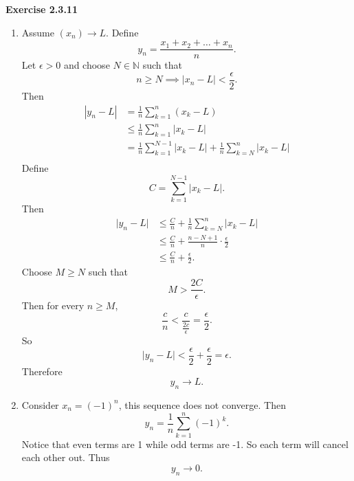 \documentclass[12pt]{article}
\begin{document}
\textbf{Exercise 2.3.11}
\begin{enumerate}[label=(\alph*)]
    \item Assume \( (x_n) \to L\).
          Define
          \[
              y_n = \frac{x_1 + x_2 + \dots + x_n}{n}.
          \]
          Let \( \epsilon >0 \) and choose \( N \in \mathbb{N} \) such that
          \[
              n \geq N \implies |x_n - L| < \frac{\epsilon}{2}.
          \]
          Then
          \[
              \begin{split}
                  |y_n - L| & = \frac{1}{n} \sum_{k=1}^n (x_k - L)                                                                \\
                            & \leq \frac{1}{n} \sum_{k=1}^{n} \vert x_k - L \vert                                                 \\
                            & = \frac{1}{n} \sum_{k=1}^{N-1} \vert x_k - L \vert + \frac{1}{n} \sum_{k=N}^{n} \vert x_k - L \vert \\
              \end{split}
          \]
          Define
          \[
              C = \sum_{k=1}^{N-1} \vert x_k - L \vert.
          \]
          Then
          \[
              \begin{split}
                  \vert y_n - L \vert & \leq \frac{C}{n} + \frac{1}{n} \sum_{k=N}^{n} \vert x_k - L \vert \\
                                      & \leq \frac{C}{n} + \frac{n - N + 1}{n} \cdot \frac{\epsilon}{2}   \\
                                      & \leq  \frac{C}{n} + \frac{\epsilon}{2}.
              \end{split}
          \]
          Choose \( M \geq N \) such that
          \[
              M > \frac{2C}{\epsilon}.
          \]
          Then for every \( n \geq M \),
          \[
              \frac{c}{n} < \frac{c}{\frac{2c}{\epsilon}} = \frac{\epsilon}{2}.
          \]
          So
          \[
              \vert y_n - L \vert < \frac{\epsilon}{2} + \frac{\epsilon}{2} = \epsilon.
          \]
          Therefore
          \[
              y_n \to L.
          \]
    \item Consider \( x_n = (-1)^n \), this sequence does not converge. Then
          \[
              y_n = \frac{1}{n} \sum_{k=1}^{n} (-1)^k.
          \]
          Notice that even terms are 1 while odd terms are -1. So each term will cancel each other out.
          Thus
          \[
              y_n \to 0.
          \]
\end{enumerate}
\end{document}
